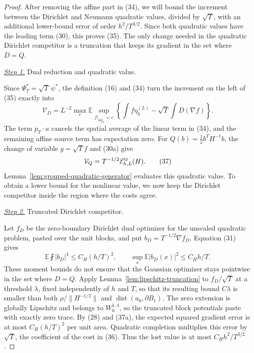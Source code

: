 \documentclass{smfart}
\theoremstyle{definition}
\newcommand{\1}{\mathbf 1}
\begin{document}
\begin{proof}
After removing the affine part in (34), we will bound the increment
between the Dirichlet and Neumann quadratic values, divided by
$\sqrt T$, with an additional lower-bound error of order
$h^2/T^{3/2}$.  Since both quadratic values have the leading term
(30), this proves (35).  The only change needed in the quadratic
Dirichlet competitor is a truncation that keeps its gradient in the
set where $D=Q$.

\smallskip\noindent
\underline{\textit{Step 1.}} Dual reduction and quadratic value.

Since $\Psi_ T^*=\sqrt T\,\psi^*$, the definition (16) and (34) turn
the increment on the left of (35) exactly into
\begin{equation}
\mathcal V_ D=L^{-2}\max_ c\mathbb E\sup_ {f|_ {\partial Q_ L}=c}
\left\{\int f\eta_ h^{(L)}-\sqrt T\int D(\nabla f)\right\}.
\tag{36}
\end{equation}
The term $p_ T\cdot a$ cancels the spatial average of the linear term
in (34), and the remaining affine source term has expectation zero.  For
$Q(b)=\frac12b^TH^{-1}b$, the change of variable
$g=\sqrt T f$ and (30a) give
\begin{equation}
\mathcal V_ Q=T^{-1/2}\mathcal E^{\rm tr}_ {h,L}(H).
\tag{37}
\end{equation}
Lemma~\ref{lem:grouped-quadratic-generator} evaluates this quadratic
value.  To obtain a lower bound for the nonlinear value, we now keep
the Dirichlet competitor inside the region where the costs agree.

\smallskip\noindent
\underline{\textit{Step 2.}} Truncated Dirichlet competitor.

Let $f_D$ be the zero-boundary Dirichlet dual optimizer for the
unscaled quadratic problem, pasted over the unit blocks, and put
$b_D=T^{-1/2}\nabla f_D$.  Equation (31) gives
\begin{equation}
\mathbb E\fint|b_ D|^4\leq C_ H(h/T)^2,\qquad
\sup_ x\mathbb E|b_ D(x)|^2\leq C_ Hh/T.
\tag{37a}
\end{equation}
These moment bounds do not ensure that the Gaussian optimizer stays
pointwise in the set where $D=Q$.  Apply
Lemma~\ref{lem:lipschitz-truncation} to $f_ D/\sqrt T$ at a threshold
$\lambda$, fixed independently of $h$ and $T$, so that its resulting
bound $C\lambda$ is
smaller than both
$\rho/\|H^{-1/2}\|$ and
$\operatorname {dist}(a_ 0,\partial B_ 1)$.  The zero extension is
globally Lipschitz and belongs to $W^{1,4}_ 0$, so the truncated block
potentials paste with exactly zero trace.  By (28) and (37a), the
expected squared gradient error is at most $C_H(h/T)^2$ per unit
area.  Quadratic completion multiplies this error by $\sqrt T$,
the coefficient of the cost in (36).  Thus the lost value is at most
$C_Hh^2/T^{3/2}$.


\end{proof}
\end{document}
